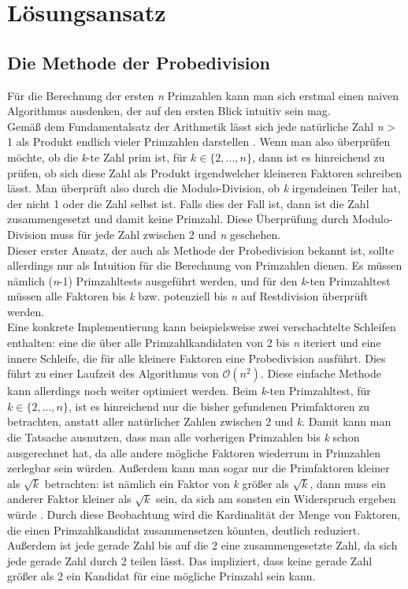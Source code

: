 \documentclass[course=erap]{aspdoc}
\begin{document}
\section{Lösungsansatz}
\subsection{Die Methode der Probedivision}
Für die Berechnung der ersten \textit{n} Primzahlen kann man sich erstmal einen naiven\\ Algorithmus ausdenken, der auf den ersten Blick intuitiv sein mag.
\\Gemäß dem Fundamentalsatz der Arithmetik lässt sich jede natürliche Zahl \textit{n} > 1 als Produkt endlich vieler Primzahlen darstellen \cite{TheoremDavidBurton2011}. 
Wenn man also überprüfen möchte, ob die \textit{k}-te Zahl prim ist, für $k \in \{2,...,n\}$, dann ist es hinreichend zu prüfen, ob sich diese Zahl als Produkt irgendwelcher kleineren Faktoren schreiben lässt. Man überprüft also durch die Modulo-Division, ob \textit{k} irgendeinen Teiler hat, der nicht 1 oder die Zahl selbst ist. Falls dies der Fall ist, dann ist die Zahl zusammengesetzt und damit keine Primzahl. Diese Überprüfung durch Modulo-Division muss für jede Zahl zwischen 2 und \textit{n} geschehen.
\\Dieser erster Ansatz, der auch als Methode der Probedivision bekannt ist, sollte allerdings nur als Intuition für die Berechnung von Primzahlen dienen. 
Es müssen nämlich (\textit{n}-1) Primzahltests ausgeführt werden, und für den \textit{k}-ten Primzahltest müssen alle Faktoren bis \textit{k} bzw. potenziell bis \textit{n} 
auf Restdivision überprüft werden.\\Eine konkrete Implementierung kann beispielsweise zwei verschachtelte Schleifen enthalten: eine die über alle Primzahlkandidaten von 2 bis  \textit{n} iteriert 
und eine innere Schleife, die für alle kleinere Faktoren eine Probedivision ausführt. Dies führt zu einer Laufzeit des Algorithmus von
$\mathcal{O}(n^2)$. Diese einfache Methode kann allerdings noch weiter optimiert werden.
Beim \textit{k}-ten Primzahltest, für $k \in \{2,...,n\}$, ist es hinreichend nur die bisher gefundenen Primfaktoren zu betrachten, anstatt aller natürlicher Zahlen zwischen 2 und \textit{k}. Damit kann man die Tatsache ausnutzen, dass man alle vorherigen Primzahlen bis \textit{k} schon ausgerechnet hat, 
da alle andere mögliche Faktoren wiederrum in Primzahlen zerlegbar sein würden. Außerdem kann man sogar nur die Primfaktoren kleiner als $\sqrt{k}$
betrachten: ist nämlich ein Faktor von \textit{k} größer als $\sqrt{k}$, dann muss ein anderer Faktor kleiner als $\sqrt{k}$ sein, da sich am sonsten ein Widerspruch ergeben würde \cite{DavidBurton2011}. Durch diese Beobachtung wird die Kardinalität der Menge von Faktoren, die einen Primzahlkandidat zusammensetzen könnten, deutlich reduziert. Außerdem ist jede gerade Zahl bis auf die 2 eine zusammengesetzte Zahl, da sich jede gerade Zahl durch 2 teilen lässt. Das impliziert, dass keine gerade Zahl größer als 2 ein Kandidat für eine mögliche Primzahl sein kann. 
\end{document}

